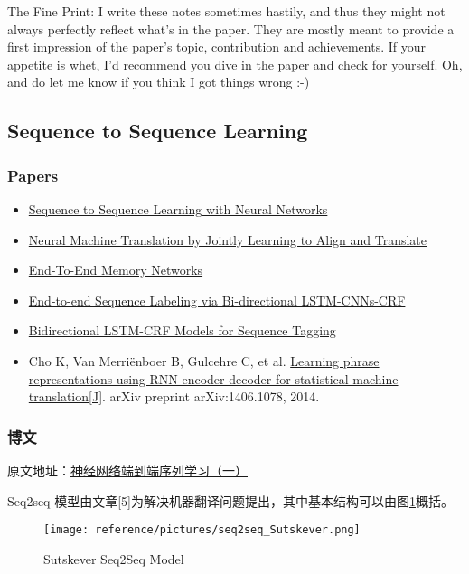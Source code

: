 \documentclass[UTF8,10pt,a4paper]{ctexbook}
\begin{document}
The Fine Print: I write these notes sometimes hastily, and thus they might not always perfectly reflect what's in the paper. They are mostly meant to provide a first impression of the paper's topic, contribution and achievements. If your appetite is whet, I'd recommend you dive in the paper and check for yourself. Oh, and do let me know if you think I got things wrong :-)


\subsection{Sequence to Sequence Learning}

\subsubsection{Papers}
\begin{itemize}
\item \href{https://arxiv.org/pdf/1409.3215.pdf}{Sequence to Sequence Learning with Neural Networks}
\item \href{https://arxiv.org/abs/1409.0473}{Neural Machine Translation by Jointly Learning to Align and Translate}
\item \href{https://arxiv.org/abs/1503.08895}{End-To-End Memory Networks}
\item \href{https://arxiv.org/pdf/1603.01354v5.pdf}{End-to-end Sequence Labeling via Bi-directional LSTM-CNNs-CRF}
\item \href{https://arxiv.org/pdf/1508.01991v1.pdf}{Bidirectional LSTM-CRF Models for Sequence Tagging}
\item Cho K, Van Merriënboer B, Gulcehre C, et al. \href{http://arxiv.org/pdf/1406.1078}{Learning phrase representations using RNN encoder-decoder for statistical machine translation[J]}. arXiv preprint arXiv:1406.1078, 2014.
\end{itemize}

\subsubsection{博文}

原文地址：\href{http://blog.csdn.net/jackytintin/article/details/53352063}{神经网络端到端序列学习（一）}

Seq2seq 模型由文章[5]为解决机器翻译问题提出，其中基本结构可以由图\ref{fig:sutskever_seq2seq}概括。
\begin{figure}[ht]
    \centering
    \texttt{[image: reference/pictures/seq2seq\_Sutskever.png]}
    \caption{Sutskever Seq2Seq Model}
    \label{fig:sutskever_seq2seq}
\end{figure}
\end{document}
